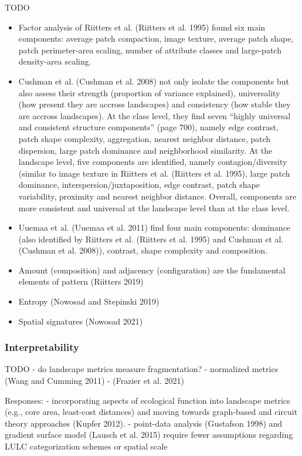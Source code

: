 \documentclass[
  10pt,
  a4paperpaper,
]{article}
\begin{document}
TODO

\begin{itemize}
\item
  Factor analysis of Riitters et al. (Riitters et al. 1995) found six
  main components: average patch compaction, image texture, average
  patch shape, patch perimeter-area scaling, number of attribute classes
  and large-patch density-area scaling.
\item
  Cushman et al. (Cushman et al. 2008) not only isolate the components
  but also assess their strength (proportion of variance explained),
  universality (how present they are accross landscapes) and consistency
  (how stable they are accross landscapes). At the class level, they
  find seven ``highly universal and consistent structure components''
  (page 700), namely edge contrast, patch shape complexity, aggregation,
  nearest neighbor distance, patch dispersion, large patch dominance and
  neighborhood similarity. At the landscape level, five components are
  identified, namely contagion/diversity (similar to image texture in
  Riitters et al. (Riitters et al. 1995), large patch dominance,
  interspersion/juxtaposition, edge contrast, patch shape variability,
  proximity and nearest neighbor distance. Overall, components are more
  consistent and universal at the landscape level than at the class
  level.
\item
  Uuemaa et al. (Uuemaa et al. 2011) find four main components:
  dominance (also identified by Riitters et al. (Riitters et al. 1995)
  and Cushman et al. (Cushman et al. 2008)), contrast, shape complexity
  and composition.
\item
  Amount (composition) and adjacency (configuration) are the fundamental
  elements of pattern (Riitters 2019)
\item
  Entropy (Nowosad and Stepinski 2019)
\item
  Spatial signatures (Nowosad 2021)
\end{itemize}

\subsubsection{Interpretability}\label{interpretability}

TODO - do landscape metrics measure fragmentation? - normalized metrics
(Wang and Cumming 2011) - (Frazier et al. 2021)

Responses: - incorporating aspects of ecological function into landscape
metrics (e.g., core area, least-cost distances) and moving towards
graph-based and circuit theory approaches (Kupfer 2012). - point-data
analysis (Gustafson 1998) and gradient surface model (Lausch et al.
2015) require fewer assumptions regarding LULC categorization schemes or
spatial scale
\end{document}

